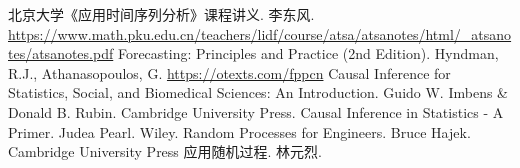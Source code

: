 \begin{thebibliography}{99}
    北京大学《应用时间序列分析》课程讲义. 李东风. \url{https://www.math.pku.edu.cn/teachers/lidf/course/atsa/atsanotes/html/_atsanotes/atsanotes.pdf}
    Forecasting: Principles and Practice (2nd Edition). Hyndman, R.J., Athanasopoulos, G. \url{https://otexts.com/fppcn}
    Causal Inference for Statistics, Social, and Biomedical Sciences: An Introduction. Guido W. Imbens \& Donald B. Rubin. Cambridge University Press.
    Causal Inference in Statistics - A Primer. Judea Pearl. Wiley.
    Random Processes for Engineers. Bruce Hajek. Cambridge University Press
    应用随机过程. 林元烈. 


\end{thebibliography}